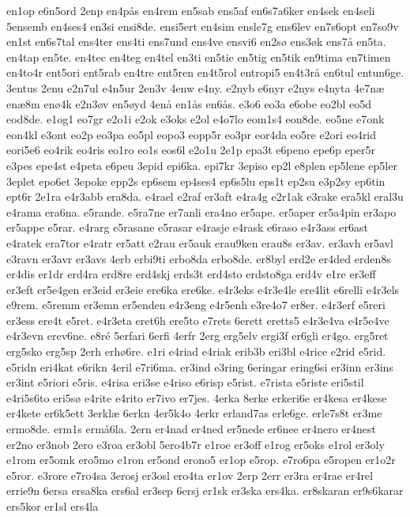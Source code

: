{en1op
e6n5ord
2enp
en4p^^e5s
en4rem
en5sab
ens5af
en6s7a6ker
en4sek
en4seli
5ensemb
en4ses4
en3si
ensi8de.
ensi5ert
en4sim
ensle7g
ens6lev
en7s6opt
en7so9v
en1st
en6s7tal
ens4ter
ens4ti
ens7und
ens4ve
ensvi6
en2s^^f8
ens3^^f8k
ens7^^e5
en5ta.
en4tap
en5te.
en4tec
en4teg
en4tel
en3ti
en5tie
en5tig
en5tik
en9tima
en7timen
en4to4r
ent5ori
ent5rab
en4tre
ent5ren
en4t5rol
entropi5
en4t3r^^e5
en6tul
entun6ge.
3entus
2enu
e2n7ul
e4n5ur
2en3v
4enw
e4ny.
e2nyb
e6nyr
e2nys
e4nyta
4e7n^^e6
en^^e68m
en^^f84k
e2n3^^f8v
en5^^f8yd
4en^^e5
en1^^e5s
en6^^e5s.
e3o6
eo3a
e6obe
eo2bl
eo5d
eod8de.
e1og1
eo7gr
e2o1i
e2ok
e3oks
e2ol
e4o7lo
eom1s4
eon8de.
eo5ne
e7onk
eon4kl
e3ont
eo2p
eo3pa
eo5pl
eopo3
eopp5r
eo3pr
eor4da
eo5re
e2ori
eo4rid
eori5e6
eo4rik
eo4ris
eo1ro
eo1s
eos6l
e2o1u
2e1p
epa3t
e6peno
epe6p
eper5r
e3pes
epe4st
e4peta
e6peu
3epid
epi6ka.
epi7kr
3episo
ep2l
e8plen
ep5lene
ep5ler
3eplet
epo6et
3epoke
epp2s
ep6sem
ep4ses4
ep6s5lu
eps1t
ep2su
e3p2sy
ep6tin
ept6r
2e1ra
e4r3abb
era8da.
e4rael
e2raf
er3aft
e4ra4g
e2r1ak
e3rake
era5kl
eral3u
e4rama
era6na.
e5rande.
e5ra7ne
er7anli
era4no
er5ape.
er5aper
er5a4pin
er3apo
er5appe
e5rar.
e4rarg
e5rasane
e5rasar
e4rasje
e4rask
e6raso
e4r3ass
er6ast
e4ratek
era7tor
e4ratr
er5att
e2rau
er5auk
erau9ken
erau8s
er3av.
er3avh
er5avl
e3ravn
er3avr
er3avs
4erb
erbi9ti
erbo8da
erbo8de.
er8byl
erd2e
er4ded
erden8s
er4dis
er1dr
erd4ra
erd8re
erd4skj
erds3t
erd4sto
erdsto8ga
erd4v
e1re
er3eff
er3eft
er5e4gen
er3eid
er3eie
ere6ka
ere6ke.
e4r3eks
e4r3e4le
ere4lit
e6relli
e4r3els
e9rem.
e5remm
er3emn
er5enden
e4r3eng
e4r5enh
e3re4o7
er8er.
e4r3erf
e5reri
er3ess
ere4t
e5ret.
e4r3eta
eret6h
ere5to
e7rets
6erett
eretts5
e4r3e4va
e4r5e4ve
e4r3evn
erev6ne.
e8r^^e9
5erfari
6erfi
4erfr
2erg
erg5elv
ergi3f
er6gli
er4go.
erg5ret
erg5sko
erg5sp
2erh
erh^^f86re.
e1ri
e4riad
e4riak
erib3b
eri3bl
e4rice
e2rid
e5rid.
e5ridn
eri4kat
e6rikn
4eril
e7ri6ma.
er3ind
e3ring
6eringar
ering6si
er3inn
er3ins
er3int
e5riori
e5ris.
e4risa
eri3se
e4riso
e6risp
e5rist.
e7rista
e5riste
eri5stil
e4ri5s6to
eri5s^^f8
e4rite
e4rito
er7ivo
er7jes.
4erka
8erke
erkeri6e
er4kesa
er4kese
er4kete
er6k5ett
3erkl^^e6
6erkn
4er5k4o
4erkr
erland7as
erle6ge.
erle7s8t
er3me
ermo8de.
erm1s
erm^^e56la.
2ern
er4nad
er4ned
er5nede
er6nee
er4nero
er4nest
er2no
er3nob
2ero
e3roa
er3obl
5ero4b7r
e1roe
er3off
e1rog
er5oks
e1rol
er3oly
e1rom
er5omk
ero5mo
e1ron
er5ond
erono5
er1op
e5rop.
e7ro6pa
e5ropen
er1o2r
e5ror.
e3rore
e7ro4sa
3erosj
er3osl
ero4ta
er1ov
2erp
2err
er3ra
er4rae
er4rel
errie9n
6ersa
ersa8ka
ers6al
er3sep
6ersj
er1sk
er3ska
ers4ka.
er8skaran
er9s6karar
ers5kor
er1sl
ers4la
}
